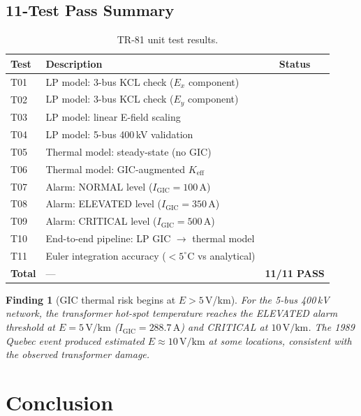 \documentclass[11pt, a4paper]{article}
\newcommand{\cmark}{\ding{51}}
\newtheorem{finding}{Finding}
\begin{document}
\subsection{11-Test Pass Summary}

\begin{table}[ht]
\centering
\caption{TR-81 unit test results.}
\label{tab:tests}
\begin{tabular}{llc}
\toprule
Test & Description & Status \\
\midrule
T01 & LP model: 3-bus KCL check ($E_x$ component) & \cmark \\
T02 & LP model: 3-bus KCL check ($E_y$ component) & \cmark \\
T03 & LP model: linear E-field scaling & \cmark \\
T04 & LP model: 5-bus 400\,kV validation & \cmark \\
T05 & Thermal model: steady-state (no GIC) & \cmark \\
T06 & Thermal model: GIC-augmented $K_{\mathrm{eff}}$ & \cmark \\
T07 & Alarm: NORMAL level ($I_{\mathrm{GIC}} = 100$\,A) & \cmark \\
T08 & Alarm: ELEVATED level ($I_{\mathrm{GIC}} = 350$\,A) & \cmark \\
T09 & Alarm: CRITICAL level ($I_{\mathrm{GIC}} = 500$\,A) & \cmark \\
T10 & End-to-end pipeline: LP GIC $\to$ thermal model & \cmark \\
T11 & Euler integration accuracy ($< 5^\circ$C vs analytical) & \cmark \\
\midrule
\textbf{Total} & --- & \textbf{11/11 PASS} \\
\bottomrule
\end{tabular}
\end{table}

\begin{finding}[GIC thermal risk begins at $E > 5$\,V/km]
For the 5-bus 400\,kV network, the transformer hot-spot temperature
reaches the ELEVATED alarm threshold at $E = 5\,\text{V/km}$
($I_{\mathrm{GIC}} = 288.7\,\text{A}$) and CRITICAL at $10\,\text{V/km}$.
The 1989 Quebec event produced estimated $E \approx 10\,\text{V/km}$
at some locations, consistent with the observed transformer damage.
\end{finding}

\section{Conclusion}
\label{sec:conclusion}
\end{document}
